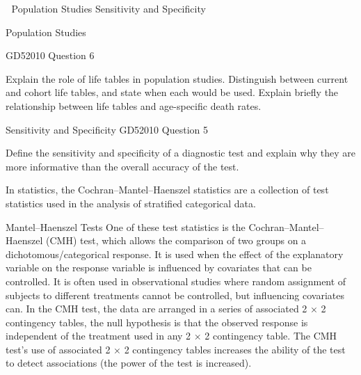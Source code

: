 

Population Studies
Sensitivity and Specificity
 
Population Studies
 
GD52010 Question 6
 
Explain the role of life tables in population studies.
Distinguish between current and cohort life tables, and state when each would be used.
Explain briefly the relationship between life tables and age-specific death rates.
 
Sensitivity and Specificity
GD52010 Question 5
 
Define the sensitivity and specificity of a diagnostic test and explain why they are more informative than the overall accuracy of the test.

In statistics, the Cochran–Mantel–Haenszel statistics are a collection of test statistics used in the analysis of stratified categorical data.

Mantel–Haenszel Tests
One of these test statistics is the Cochran–Mantel–Haenszel (CMH) test, which allows the comparison of two groups on a dichotomous/categorical response. It is used when the effect of the explanatory variable on the response variable is influenced by covariates that can be controlled. It is often used in observational studies where random assignment of subjects to different treatments cannot be controlled, but influencing covariates can.
In the CMH test, the data are arranged in a series of associated 2 × 2 contingency tables, the null hypothesis is that the observed response is independent of the treatment used in any 2 × 2 contingency table. The CMH test's use of associated 2 × 2 contingency tables increases the ability of the test to detect associations (the power of the test is increased).
